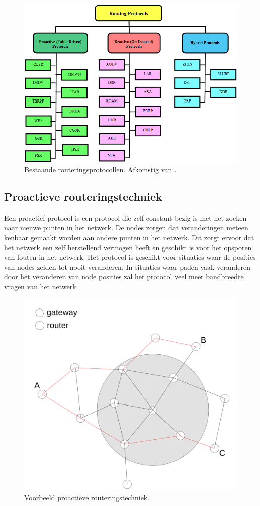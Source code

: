 \documentclass[a4paper, 11pt, oneside]{report}
\begin{document}
\begin{figure}[H]
	\begin{center}\includegraphics[width=0.6\linewidth]{Afbeeldingen/meshprotocollen.png}\end{center}
	\caption{Bestaande routeringsprotocollen. Afkomstig van \protect\cite{meshprotocols}.}
	\label{fig:meshprotcollen}
\end{figure}

\subsection{Proactieve routeringstechniek}
\label{sec:meshnetwerktechniek:proactief}

Een proactief protocol is een protocol die zelf constant bezig is met het zoeken naar nieuwe punten in het netwerk.
De nodes zorgen dat veranderingen meteen kenbaar gemaakt worden aan andere punten in het netwerk. 
Dit zorgt ervoor dat het netwerk een zelf herstellend vermogen heeft en geschikt is voor het opsporen van fouten in het netwerk.
Het protocol is geschikt voor situaties waar de posities van nodes zelden tot nooit veranderen. 
In situaties waar paden vaak veranderen door het veranderen van node posities zal het protocol veel meer bandbreedte vragen van het netwerk. 

\begin{figure}[H]
	\begin{center}\includegraphics[width=0.45\linewidth]{Afbeeldingen/proactive.png}\end{center}
	\caption{Voorbeeld proactieve routeringstechniek.}
	\label{fig:proactief}
\end{figure}
\end{document}
